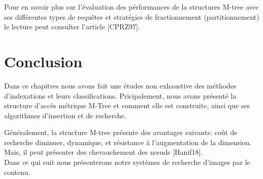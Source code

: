 Pour en savoir plus sur l'évaluation des pérformances de la structures M-tree avec ses différentes types de requêtes et stratégies de fractionnement (partitionnement) le lecture peut consulter l'article [CPRZ97].

\section{Conclusion}
Dans ce chapitres nous avons fait une études non exhaustive des méthodes d'indexations et leurs classifications. Pricipalement, nous avons présenté la structure d'accès métrique M-Tree et comment elle est construite, ainsi que ses algorithmes d'insertion et de recherche.

Généralement, la structure M-tree présente des avantages suivants: coût de recherche diminuer, dynamique, et résistance à l’augmentation de
la dimension. Mais, il peut présenter des chevauchement des nœuds [Hanif18].\\


Dans ce qui suit nous présenterons notre systèmes de recherche d'images par le contenu.

%
%
%
%


